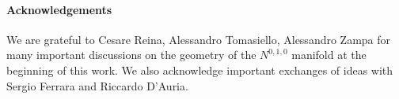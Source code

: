 \documentclass[a4paper,12pt]{article}
\def\n010{N^{0,1,0}}
\begin{document}
\paragraph{Acknowledgements}
We are grateful to Cesare Reina, Alessandro Tomasiello, Alessandro Zampa for many
important discussions on the geometry of the $\n010$ manifold at the beginning of
this work. We also acknowledge important exchanges of ideas with Sergio Ferrara
and Riccardo D'Auria.
\appendix
\end{document}
